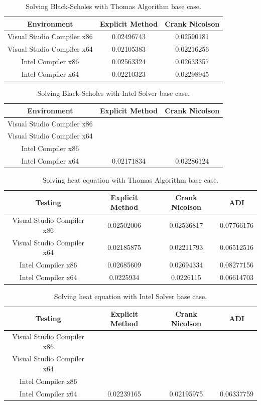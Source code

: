 \documentclass[12pt, oneside]{book}
\theoremstyle{plain}
\theoremstyle{definition}
\begin{document}
\begin{table}[h!]
\centering
 \begin{tabular}{||c c c||} 
 \hline
 Environment & Explicit Method & Crank Nicolson\\ [0.5ex] 
 \hline\hline\hline
 Visual Studio Compiler x86 & 0.02496743 & 0.02590181 \\ 
 Visual Studio Compiler x64 & 0.02105383 & 0.02216256 \\
 Intel Compiler x86 & 0.02563324 & 0.02633357 \\
 Intel Compiler x64 & 0.02210323 & 0.02298945\\ [1ex] 
 \hline
 \end{tabular}
 \caption{Solving Black-Scholes with Thomas Algorithm base case.}
\end{table}

\begin{table}[h!]
\centering
 \begin{tabular}{||c c c||} 
 \hline
 Environment & Explicit Method & Crank Nicolson\\ [0.5ex] 
 \hline\hline\hline
 Visual Studio Compiler x86 &  \\ 
 Visual Studio Compiler x64 & \\
 Intel Compiler x86 & \\
 Intel Compiler x64 & 0.02171834 & 0.02286124\\ [1ex] 
 \hline
 \end{tabular}
 \caption{Solving Black-Scholes with Intel Solver base case.}
\end{table}

\begin{table}[htp!]
\centering
 \begin{tabular}{||c c c c||} 
 \hline
 Testing & Explicit Method & Crank Nicolson & ADI\\ [0.5ex] 
 \hline\hline\hline
 Visual Studio Compiler x86 & 0.02502006 & 0.02536817 & 0.07766176 \\ 
 Visual Studio Compiler x64 & 0.02185875 & 0.02211793 & 0.06512516 \\
 Intel Compiler x86 & 0.02685609 & 0.02694334 & 0.08277156\\
 Intel Compiler x64 & 0.0225934 & 0.0226115 & 0.06614703\\[1ex] 
 \hline
 \end{tabular}
 \caption{Solving heat equation with Thomas Algorithm base case.}
\end{table}
 
 
\begin{table}[htp!]
\centering
 \begin{tabular}{||c c c c||} 
 \hline
 Testing & Explicit Method & Crank Nicolson & ADI\\ [0.5ex] 
 \hline\hline\hline
 Visual Studio Compiler x86 \\ 
 Visual Studio Compiler x64 &  \\
 Intel Compiler x86 & \\
 Intel Compiler x64 & 0.02239165 & 0.02195975 & 0.06337759\\[1ex] 
 \hline
 \end{tabular}
 \caption{Solving heat equation with Intel Solver base case.}
\end{table}
 
\end{document}
